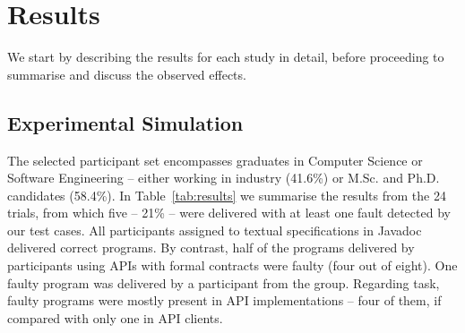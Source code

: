 \section{Results}
\label{sec:results}

We start by describing the results for each study in detail, before proceeding to summarise and discuss the observed effects.

\subsection{Experimental Simulation}
\label{sec:expResults}

The selected participant set encompasses graduates in Computer Science or Software Engineering -- either working in industry (41.6\%) or M.Sc. and Ph.D. candidates (58.4\%).
In Table~\ref{tab:results} we summarise the results from the 24 trials, from which five -- 21\% -- were delivered with at least one fault detected by our test cases.
All participants assigned to textual specifications in Javadoc delivered correct programs.
By contrast, half of the programs delivered by participants using APIs with formal contracts were faulty (four out of eight).
One faulty program was delivered by a participant from the \contractjdoc{} group.
Regarding task, faulty programs were mostly present in API implementations -- four of them, if compared with only one in API clients.





